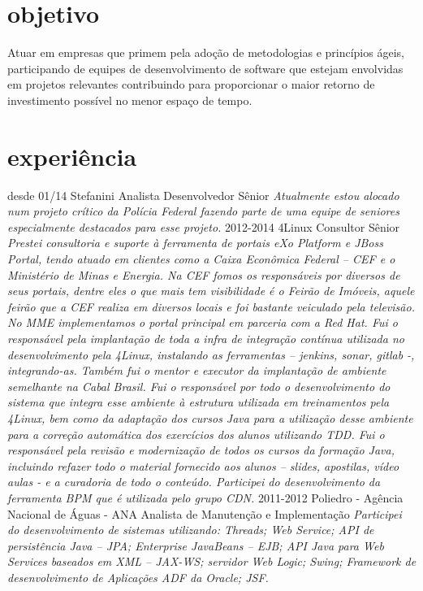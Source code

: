 \section{objetivo}

Atuar em empresas que primem pela adoção de metodologias e princípios ágeis, participando de equipes de desenvolvimento de software que estejam envolvidas em projetos relevantes contribuindo para proporcionar o maior retorno de investimento possível no menor espaço de tempo. 

\section{experiência}

\begin{entrylist}
  \entry
    {desde 01/14}
    {Stefanini}
    {Analista Desenvolvedor Sênior}
    {\emph{Atualmente estou alocado num projeto crítico da Polícia Federal fazendo parte de uma equipe de seniores especialmente destacados para esse projeto.}}
  \entry
    {2012-2014}
    {4Linux}
    {Consultor Sênior}
    {\emph{Prestei consultoria e suporte à ferramenta de portais eXo Platform e JBoss Portal, tendo atuado em clientes como a Caixa Econômica Federal – CEF e o Ministério de Minas e Energia. Na CEF fomos os responsáveis por diversos de seus portais, dentre eles o que mais tem visibilidade é o Feirão de Imóveis, aquele feirão que a CEF realiza em diversos locais e foi bastante veiculado pela televisão. No MME implementamos o portal principal em parceria com a Red Hat.
Fui o responsável pela implantação de toda a infra de integração contínua utilizada no desenvolvimento pela 4Linux, instalando as ferramentas – jenkins, sonar, gitlab -, integrando-as.
Também fui o mentor e executor da implantação de ambiente semelhante na Cabal Brasil.
Fui o responsável por todo o desenvolvimento do sistema que integra esse ambiente à estrutura utilizada em treinamentos pela 4Linux, bem como da adaptação dos cursos Java para a utilização desse ambiente para a correção automática dos exercícios dos alunos utilizando TDD.
Fui o responsável pela revisão e modernização de todos os cursos da formação Java, incluindo refazer todo o material fornecido aos alunos – slides, apostilas, vídeo aulas - e a curadoria de todo o conteúdo.
Participei do desenvolvimento da ferramenta BPM que é utilizada pelo grupo CDN.}}
  \entry
    {2011-2012}
    {Poliedro - Agência Nacional de Águas - ANA}
    {Analista de Manutenção e Implementação}
    {\emph{Participei do desenvolvimento de sistemas utilizando: Threads; Web Service;  API de persistência Java – JPA; Enterprise JavaBeans – EJB; API Java para Web Services baseados em XML – JAX-WS; servidor Web Logic; Swing; Framework de desenvolvimento de Aplicações ADF da Oracle; JSF.}}

\end{entrylist}
